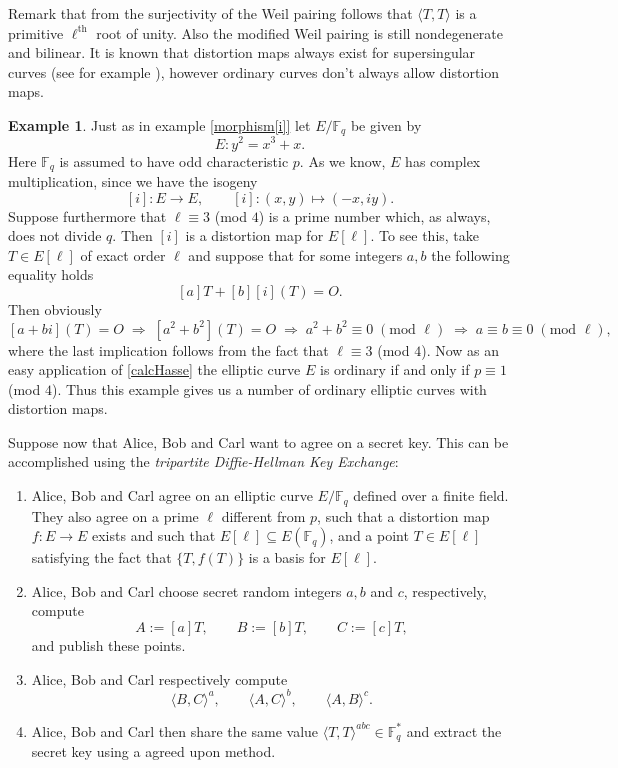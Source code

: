 \documentclass{article}
\numberwithin{equation}{section}
\theoremstyle{definition}
\newtheorem{example}[theorem]{Example}
\newcommand{\FF}[1]{{\mathbb F}_{#1}} %
\begin{document}
Remark that from the surjectivity of the Weil pairing follows that $\langle T,T \rangle$ is a primitive $\ell^\text{th}$ root of unity. Also the modified Weil pairing is still nondegenerate and bilinear. It is known  that distortion maps always exist for supersingular curves (see for example  \cite{Verheul}), however ordinary curves don't always allow distortion maps. 

\begin{example}
Just as in example \ref{morphism[i]} let $E/\FF{q}$ be given by $$E:y^2=x^3+x.$$ Here $\FF{q}$ is assumed to have odd characteristic $p$. As we know, $E$ has complex multiplication, since we have the isogeny $$[i]:E \rightarrow E, \qquad [i]: (x,y) \mapsto (-x,iy).$$ Suppose furthermore that $\ell \equiv 3$ (mod $4$) is a prime number which, as always, does not divide $q$. Then $[i]$ is a distortion map for $E[\ell]$. To see this, take $T\in E[\ell]$ of exact order $\ell$ and suppose that for some integers $a,b$ the following equality holds $$[a]T+[b][i](T) = O.$$ Then obviously $$[a+bi](T)=O  \;\Rightarrow\;  [a^2+b^2](T)=O \;\Rightarrow\;  a^2+b^2 \equiv 0\; (\text{mod } \ell)\; \Rightarrow\;  a \equiv b \equiv 0\; (\text{mod } \ell),$$ where the last implication follows from the fact that $\ell \equiv 3$ (mod $4$). Now as an easy application of \ref{calcHasse} the elliptic curve $E$ is ordinary if and only if $p \equiv 1$ (mod $4$). Thus this example gives us a number of ordinary elliptic curves with distortion maps.
\end{example} 

Suppose now that Alice, Bob and Carl want to agree on a secret key. This can be accomplished using the \emph{tripartite Diffie-Hellman Key Exchange}:

\begin{enumerate}
\item Alice, Bob and Carl agree on an elliptic curve $E/\FF{q}$ defined over a finite field. They also agree on a prime $\ell$ different from $p$, such that a distortion map $f:E \rightarrow E$ exists and such that $E[\ell] \subseteq E(\FF{q})$, and a point $T \in E[\ell]$ satisfying the fact that $\{T,f(T)\}$ is a basis for $E[\ell]$.
\item Alice, Bob and Carl choose secret random integers $a,b$ and $c$, respectively, compute $$A:=[a]T,\qquad B:=[b]T, \qquad C:=[c]T,$$ and publish these points.
\item Alice, Bob and Carl respectively compute $$\langle B,C \rangle^a,\qquad \langle A,C \rangle^b,\qquad \langle A,B \rangle^c.$$
\item Alice, Bob and Carl then share the same value $\langle T,T \rangle^{abc}\in \FF{q}^*$ and extract the secret key using a agreed upon method. 
\end{enumerate}
\end{document}
